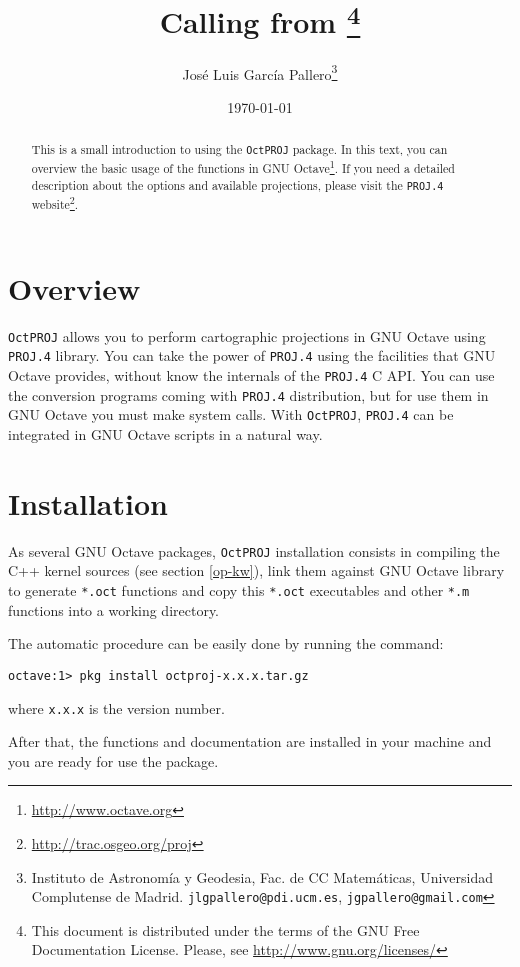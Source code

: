 \documentclass[10pt,a4paper]{article}
\title{\octproj\\Calling \proj{} from \octave\footnote{This document is
       distributed under the terms of the GNU Free Documentation License.
       Please, see \url{http://www.gnu.org/licenses/}}}
\author{Jos\'e Luis Garc\'ia Pallero\footnote{Instituto de Astronom\'ia y
        Geodesia, Fac. de CC Matem\'aticas, Universidad Complutense de Madrid.
        \texttt{jlgpallero@pdi.ucm.es}, \texttt{jgpallero@gmail.com}}}
\date{\today}
\newcommand{\octproj}{\texttt{OctPROJ}}
\newcommand{\proj}{\texttt{PROJ.4}}
\newcommand{\octave}{GNU Octave}
\begin{document}
\maketitle

\nocite{eat-om}
\nocite{projman}
\nocite{projir1}
\nocite{projir2}
\nocite{sny-wm}

\begin{abstract}
This is a small introduction to using the \octproj{} package. In this text, you
can overview the basic usage of the functions in
\octave\footnote{\url{http://www.octave.org}}. If you need a detailed
description about the options and available projections, please visit the
\proj{} website\footnote{\url{http://trac.osgeo.org/proj}}.
\end{abstract}

\section{Overview}

\octproj{} allows you to perform cartographic projections in \octave{} using
\proj{} library. You can take the power of \proj{} using the facilities that
\octave{} provides, without know the internals of the \proj{} C API. You can use
the conversion programs coming with \proj{} distribution, but for use them in
\octave{} you must make system calls. With \octproj{}, \proj{} can be integrated
in \octave{} scripts in a natural way.

\section{Installation}

As several \octave{} packages, \octproj{} installation consists in compiling the
C++ kernel sources (see section \ref{op-kw}), link them against \octave{}
library to generate \texttt{*.oct} functions and copy this \texttt{*.oct}
executables and other \texttt{*.m} functions into a working directory.

The automatic procedure can be easily done by running the command:

\begin{verbatim}
octave:1> pkg install octproj-x.x.x.tar.gz
\end{verbatim}
where \texttt{x.x.x} is the version number.

After that, the functions and documentation are installed in your machine and
you are ready for use the package.
\end{document}
